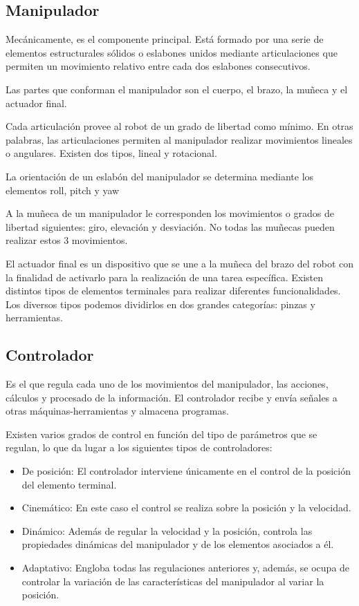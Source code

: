 \documentclass[12pt,a4paper]{report}
\begin{document}
\subsection{Manipulador}

Mecánicamente, es el componente principal. Está formado por una serie de
elementos estructurales sólidos o eslabones unidos mediante articulaciones
que permiten un movimiento relativo entre cada dos eslabones consecutivos. 

Las partes que conforman el manipulador son el cuerpo, el brazo, la muñeca y el
actuador final. 

Cada articulación provee al robot de un grado de libertad como mínimo. En
otras palabras, las articulaciones permiten al manipulador realizar
movimientos lineales o angulares. Existen dos tipos, lineal y rotacional. 

La orientación de un eslabón del manipulador se determina
mediante los elementos roll, pitch y yaw

A la muñeca de un manipulador le corresponden los movimientos o grados de
libertad siguientes: giro, elevación y desviación. No todas las muñecas pueden
realizar estos 3 movimientos. 

El actuador final es un dispositivo que se une a la muñeca del
brazo del robot con la finalidad de activarlo para la realización de una
tarea específica. Existen distintos tipos de elementos
terminales para realizar diferentes funcionalidades. Los diversos
tipos podemos dividirlos en dos grandes categorías: pinzas y herramientas.


\subsection{Controlador}
Es el que regula cada uno de los movimientos del manipulador, las acciones,
cálculos y procesado de la información. El controlador recibe y envía señales a
otras máquinas-herramientas y almacena programas.

Existen varios grados de control en función del tipo de
parámetros que se regulan, lo que da lugar a los siguientes tipos de
controladores:
\begin{itemize}
    \item De posición:
    El controlador interviene únicamente en el control de la posición del
    elemento terminal.
    \item Cinemático: 
    En este caso el control se realiza sobre la posición y la velocidad.
    \item Dinámico:
    Además de regular la velocidad y la posición, controla las propiedades
    dinámicas del manipulador y de los elementos asociados a él.
    \item Adaptativo: 
    Engloba todas las regulaciones anteriores y, además, se ocupa de controlar 
    la variación de las características del manipulador al variar la posición.
\end{itemize}
\end{document}
